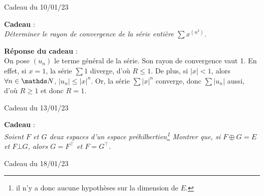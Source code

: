 \documentclass[a4paper]{article}
\begin{document}
	\clearpage
	\centerline{\LARGE Cadeau du 10/01/23}

	\bigskip
	\bigskip
	\bigskip
	\textbf{Cadeau} :\\
	\textsl{Déterminer le rayon de convergence de la série entière $\sum x^{(n^2)}$.}

	\bigskip
	\bigskip
	\textbf{Réponse du cadeau} :\\
	On pose $(u_n)$\/ le terme général de la série.
	Son rayon de convergence vaut 1. En effet, si $x = 1$, la série $\sum 1$\/ diverge, d'où $R \le 1$.
	De plus, si $|x| < 1$, alors $\forall n \in \N$, $|u_n| \le |x|^n$.
	Or, la série $\sum |x|^n$\/ converge, donc $\sum |u_n|$\/ aussi, d'où $R \ge 1$\/ et donc $R = 1$.
	\clearpage
	\centerline{\LARGE Cadeau du 13/01/23}

	\bigskip
	\bigskip
	\bigskip
	\textbf{Cadeau} :\\
	\textsl{Soient $F$\/ et $G$\/ deux espaces d'un espace préhilbertien\footnote{il n'y a donc aucune hypothèses sur la dimension de $E$.} Montrer que, si $F \oplus G = E$\/ et $F \bot G$, alors $G = F^\top$\/ et $F = G^\top$.}

	\clearpage
	\centerline{\LARGE Cadeau du 18/01/23}
\end{document}

